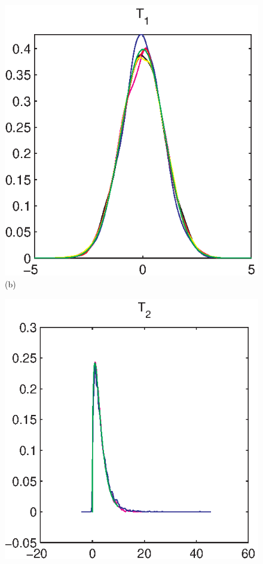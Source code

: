 \documentclass[authoryear,preprint,12pt]{elsarticle}
\begin{document}
\begin{figure}[tbp]
\begin{center}
\begin{minipage}[]{0.45\textwidth}
      \includegraphics[width=\textwidth]{mrmcomplex14nyhighden.eps}
      (b)
    \end{minipage}
    \begin{minipage}[]{0.45\textwidth}
      \centering
      \includegraphics[width=\textwidth]{mrmcomplex15ny.eps}

\end{minipage}
\end{center}
\end{figure}
\end{document}
